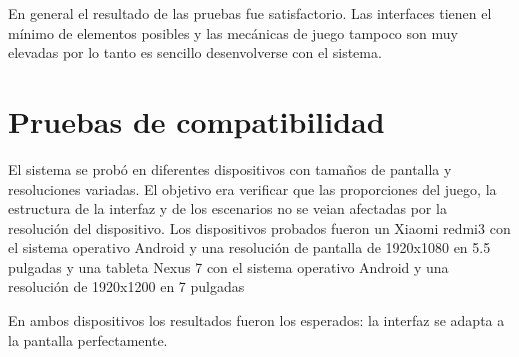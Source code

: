 En general el resultado de las pruebas fue satisfactorio. Las interfaces tienen el mínimo de elementos posibles y las mecánicas de juego tampoco son muy elevadas por lo tanto es sencillo desenvolverse con el sistema.

\section{Pruebas de compatibilidad}

El sistema se probó en diferentes dispositivos con tamaños de pantalla y resoluciones variadas. El objetivo era verificar que las proporciones del juego, la estructura de la interfaz y de los escenarios no se veian afectadas por la resolución del dispositivo. Los dispositivos probados fueron un Xiaomi redmi3 con el sistema operativo Android y una resolución de pantalla de 1920x1080 en 5.5 pulgadas y una tableta Nexus 7 con el sistema operativo Android y una resolución de 1920x1200 en 7 pulgadas


En ambos dispositivos los resultados fueron los esperados: la interfaz se adapta a la pantalla perfectamente. 


